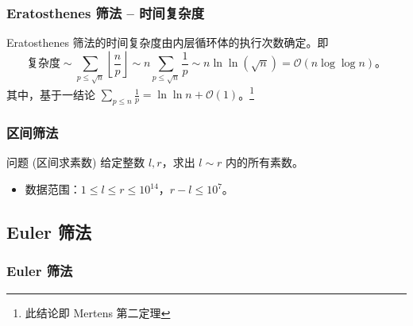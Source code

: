 \documentclass{../pkslide}
\begin{document}
\begin{frame}
  \frametitle{Eratosthenes 筛法 -- 时间复杂度}
  Eratosthenes 筛法的时间复杂度由内层循环体的执行次数确定。即%
  \[%
    \text{复杂度} \sim \sum_{p \le \sqrt{n}} \left\lfloor \frac{n}{p} \right\rfloor \sim n \sum_{p \le \sqrt{n}} \frac{1}{p} \sim n \ln \ln \!\left( \sqrt{n} \right) = \mathcal O (n \log \log n) \text{。}
  \]%
  其中，基于一结论 $\displaystyle \sum_{p \le n} \frac{1}{p} = \ln \ln n + \mathcal O (1)$。\footnote{此结论即 Mertens 第二定理}
  
\end{frame}

\begin{frame}
  \frametitle{区间筛法}
  \begin{block}{问题 (区间求素数)}
    给定整数 $l, r$，求出 $l \sim r$ 内的所有素数。
    
    \begin{itemize}
      \item[\textbullet] 数据范围：$1 \le l \le r \le {10}^{14}$，$r - l \le {10}^7$。
    \end{itemize}
  \end{block}
  
\end{frame}


\subsection{Euler 筛法}
\subsubsection*{Euler 筛法}
\end{document}
